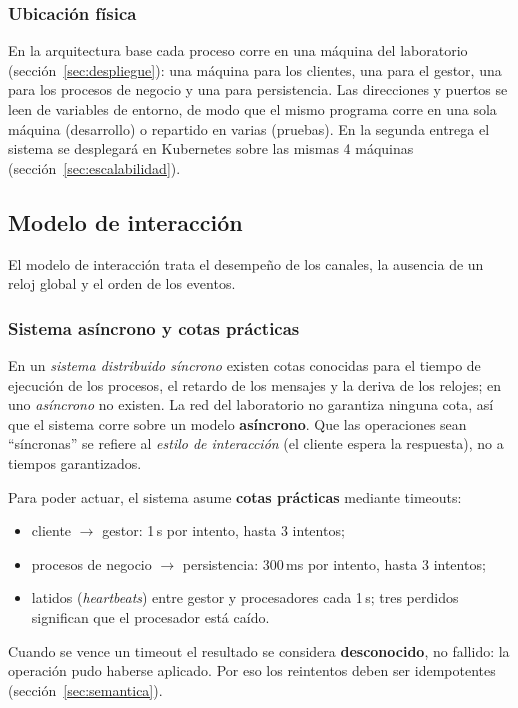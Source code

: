 \subsubsection{Ubicación física}

En la arquitectura base cada proceso corre en una máquina del laboratorio
(sección~\ref{sec:despliegue}): una máquina para los clientes, una para el
gestor, una para los procesos de negocio y una para persistencia. Las direcciones y
puertos se leen de variables de entorno, de modo que el mismo programa corre en una
sola máquina (desarrollo) o repartido en varias (pruebas). En la segunda entrega el
sistema se desplegará en Kubernetes sobre las mismas 4 máquinas
(sección~\ref{sec:escalabilidad}).

\subsection{Modelo de interacción}

El modelo de interacción trata el desempeño de los canales, la ausencia de un reloj
global y el orden de los eventos.

\subsubsection{Sistema asíncrono y cotas prácticas}

En un \emph{sistema distribuido síncrono} existen cotas conocidas para el tiempo de
ejecución de los procesos, el retardo de los mensajes y la deriva de los relojes;
en uno \emph{asíncrono} no existen. La red del laboratorio no garantiza ninguna
cota, así que el sistema corre sobre un modelo \textbf{asíncrono}. Que las
operaciones sean ``síncronas'' se refiere al \emph{estilo de interacción} (el
cliente espera la respuesta), no a tiempos garantizados.

Para poder actuar, el sistema asume \textbf{cotas prácticas} mediante timeouts:
\begin{itemize}
    \item cliente $\rightarrow$ gestor: 1\,s por intento, hasta 3 intentos;
    \item procesos de negocio $\rightarrow$ persistencia: 300\,ms por intento, hasta 3 intentos;
    \item latidos (\emph{heartbeats}) entre gestor y procesadores cada 1\,s; tres
          perdidos significan que el procesador está caído.
\end{itemize}
Cuando se vence un timeout el resultado se considera \textbf{desconocido}, no
fallido: la operación pudo haberse aplicado. Por eso los reintentos deben ser
idempotentes (sección~\ref{sec:semantica}).

